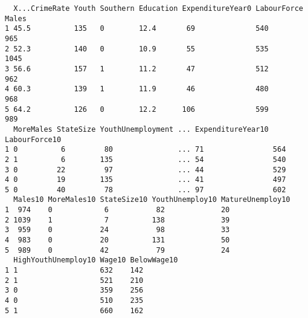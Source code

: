 \documentclass[11pt]{article}
\begin{document}
\begin{verbatim}
  X...CrimeRate Youth Southern Education ExpenditureYear0 LabourForce Males
1 45.5          135   0        12.4       69              540          965 
2 52.3          140   0        10.9       55              535         1045 
3 56.6          157   1        11.2       47              512          962 
4 60.3          139   1        11.9       46              480          968 
5 64.2          126   0        12.2      106              599          989 
  MoreMales StateSize YouthUnemployment ... ExpenditureYear10 LabourForce10
1 0          6         80               ... 71                564          
2 1          6        135               ... 54                540          
3 0         22         97               ... 44                529          
4 0         19        135               ... 41                497          
5 0         40         78               ... 97                602          
  Males10 MoreMales10 StateSize10 YouthUnemploy10 MatureUnemploy10
1  974    0            6           82             20              
2 1039    1            7          138             39              
3  959    0           24           98             33              
4  983    0           20          131             50              
5  989    0           42           79             24              
  HighYouthUnemploy10 Wage10 BelowWage10
1 1                   632    142        
2 1                   521    210        
3 0                   359    256        
4 0                   510    235        
5 1                   660    162        
\end{verbatim}
\end{document}
